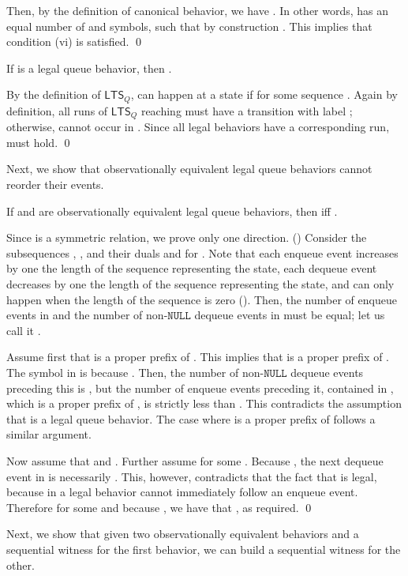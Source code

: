 \documentclass{LMCS}
\newcommand{\NULL}{\ensuremath{\mathtt{NULL}}}
\newcommand{\ltsq}{\ensuremath{{\mathsf{LTS}}_Q}}
\newcommand\mylabel[1]{\label{#1}}
\begin{document}
Then, by the definition of canonical behavior, we have
.
In other words,  has an equal number of  and  symbols, such that by construction .
This implies that condition (vi) is satisfied.
\qed



\begin{lem}\mylabel{lem:deq-after-enq}
If   is a legal queue behavior, then .
\end{lem}
\proof
By the definition of {\ltsq},  can happen at a state  if  for some sequence .
Again by definition, all runs of {\ltsq} reaching  must have a transition with label ; otherwise,  cannot occur in .
Since all legal behaviors have a corresponding run,  must hold.
\qed

Next, we show that observationally equivalent legal queue behaviors cannot reorder their  events.

\begin{lem}\mylabel{lem:obsequiv-deqnull}
If  and  are observationally equivalent legal queue behaviors, then  iff .
\end{lem}
\proof
Since  is a symmetric relation, we prove only one direction.
()
Consider the subsequences , , and their duals  and  for .
Note that each enqueue event increases by one the length of the sequence representing the state, each dequeue event decreases by one the length of the sequence representing the state, and  can only happen when the length of the sequence is zero ().
Then, the number of enqueue events in  and the number of non-{\NULL} dequeue events in  must be equal; let us call it .

Assume first that  is a proper prefix of .
This implies that  is a proper prefix of .
The  symbol in  is  because .
Then, the number of non-{\NULL} dequeue events preceding this  is , but the number of enqueue events preceding it, contained in , which is a proper prefix of , is strictly less than .
This contradicts the assumption that  is a legal queue behavior.
The case where  is a proper prefix of  follows a similar argument.

Now assume that  and .
Further assume  for some .
Because , the next dequeue event in  is necessarily .
This, however, contradicts that the fact that  is legal, 
because in a legal behavior  cannot immediately follow an enqueue event.
Therefore  for some  and because , we have that , as required.
\qed

Next, we show that given two observationally equivalent behaviors 
and a sequential witness for the first behavior, 
we can build a sequential witness for the other.
\end{document}
